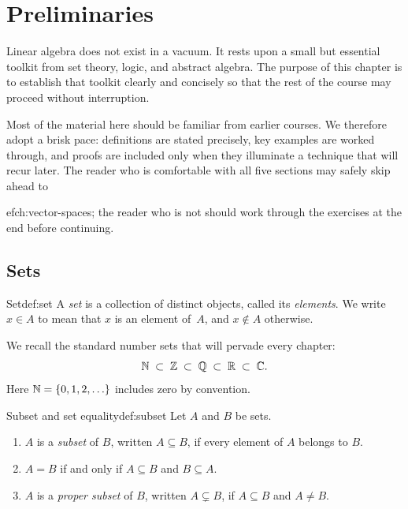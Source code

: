 
\chapter{Preliminaries}\label{ch:preliminaries}

Linear algebra does not exist in a vacuum. It rests upon a small but
essential toolkit from set theory, logic, and abstract algebra. The purpose
of this chapter is to establish that toolkit clearly and concisely so that
the rest of the course may proceed without interruption.

Most of the material here should be familiar from earlier courses. We
therefore adopt a brisk pace: definitions are stated precisely, key
examples are worked through, and proofs are included only when they
illuminate a technique that will recur later. The reader who is
comfortable with all five sections may safely skip ahead to

ef{ch:vector-spaces}; the reader who is not should work through the
exercises at the end before continuing.


\section{Sets}\label{sec:sets}

\begin{definition}{Set}{def:set}
A \emph{set} is a collection of distinct objects, called its
\emph{elements}. We write $x\in A$ to mean that $x$ is an element of~$A$,
and $x\notin A$ otherwise.
\end{definition}

We recall the standard number sets that will pervade every chapter:
\[
  {\mathbb{N}} \;\subset\; {\mathbb{Z}} \;\subset\; {\mathbb{Q}} \;\subset\; {\mathbb{R}} \;\subset\; {\mathbb{C}}.
\]
Here ${\mathbb{N}} = \left\{0,1,2,\ldots\right\}$ includes zero by convention.

\begin{definition}{Subset and set equality}{def:subset}
Let $A$ and $B$ be sets.
\begin{enumerate}[label=(\roman*)]
  \item $A$ is a \emph{subset} of $B$, written $A\subseteq B$,
    if every element of $A$ belongs to $B$.
  \item $A = B$ if and only if $A\subseteq B$ and $B\subseteq A$.
  \item $A$ is a \emph{proper subset} of $B$, written
    $A\subsetneq B$, if $A\subseteq B$ and $A\neq B$.
\end{enumerate}
\end{definition}

